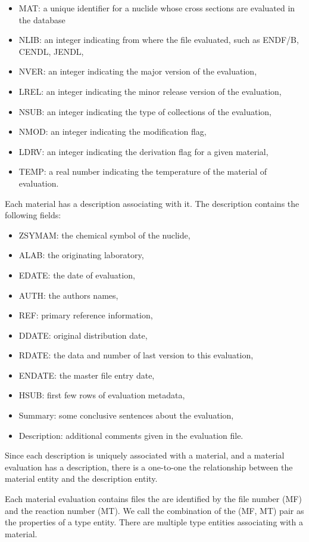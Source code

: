 \begin{itemize}
\item MAT: a  unique identifier for a nuclide whose cross sections are evaluated in the database
\item NLIB: an integer indicating from where the file evaluated, such as ENDF/B, CENDL, JENDL,
\item NVER: an integer indicating the major version of the evaluation,
\item LREL: an integer indicating the minor release version of the evaluation,
\item NSUB: an integer indicating the type of collections of the evaluation,
\item NMOD: an integer indicating the modification flag,
\item LDRV: an integer indicating the derivation flag for a given material,
\item TEMP: a real number indicating the temperature of the material of evaluation.
\end{itemize}

Each material has a description associating with it. The description contains the following fields:
\begin{itemize}
\item ZSYMAM: the chemical symbol of the nuclide,
\item ALAB:  the originating laboratory,
\item EDATE: the date of evaluation,
\item AUTH: the authors names,
\item REF: primary reference information,
\item DDATE: original distribution date,
\item RDATE: the data and number of last version to this evaluation,
\item ENDATE: the master file entry date,
\item HSUB: first few rows of evaluation metadata,
\item Summary: some conclusive sentences about the evaluation,
\item Description: additional comments given in the evaluation file.
\end{itemize}
Since each description is uniquely associated with a material, and a material evaluation has a description, there is a one-to-one the relationship between the material entity and the description entity. 

Each material evaluation contains files the are identified by the file number (MF) and the reaction number (MT). We call the combination of the (MF, MT) pair as the properties of a type entity. There are multiple type entities associating with a material. 


